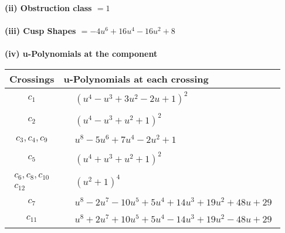 \documentclass[1p]{elsarticle_modified}
\theoremstyle{definition}
\begin{document}
\flushleft \textbf{(ii) Obstruction class $= 1$}\\~\\
\flushleft \textbf{(iii) Cusp Shapes $= -4 u^6+16 u^4-16 u^2+8$}\\~\\
\newpage\renewcommand{\arraystretch}{1}
\flushleft \textbf{(iv) u-Polynomials at the component}\newline \\
\begin{tabular}{m{50pt}|m{274pt}}
Crossings & \hspace{64pt}u-Polynomials at each crossing \\
\hline $$\begin{aligned}c_{1}\end{aligned}$$&$\begin{aligned}
&(u^4- u^3+3 u^2-2 u+1)^2
\end{aligned}$\\
\hline $$\begin{aligned}c_{2}\end{aligned}$$&$\begin{aligned}
&(u^4- u^3+u^2+1)^2
\end{aligned}$\\
\hline $$\begin{aligned}c_{3},c_{4},c_{9}\end{aligned}$$&$\begin{aligned}
&u^8-5 u^6+7 u^4-2 u^2+1
\end{aligned}$\\
\hline $$\begin{aligned}c_{5}\end{aligned}$$&$\begin{aligned}
&(u^4+u^3+u^2+1)^2
\end{aligned}$\\
\hline $$\begin{aligned}c_{6},c_{8},c_{10}\\c_{12}\end{aligned}$$&$\begin{aligned}
&(u^2+1)^4
\end{aligned}$\\
\hline $$\begin{aligned}c_{7}\end{aligned}$$&$\begin{aligned}
&u^8-2 u^7-10 u^5+5 u^4+14 u^3+19 u^2+48 u+29
\end{aligned}$\\
\hline $$\begin{aligned}c_{11}\end{aligned}$$&$\begin{aligned}
&u^8+2 u^7+10 u^5+5 u^4-14 u^3+19 u^2-48 u+29
\end{aligned}$\\
\hline
\end{tabular}\\~\\
\end{document}
